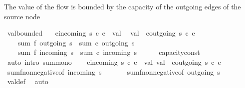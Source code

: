 \begin{isabellebody}
{\isafoldproof}%
%
\isadelimproof
%
\endisadelimproof
%
\begin{isamarkuptext}%
The value of the flow is bounded by the capacity of the 
  outgoing edges of the source node%
\end{isamarkuptext}\isamarkuptrue%
\isamarkupfalse%
\ val{\isacharunderscore}bounded{\isacharcolon}\ \isanewline
\ \ {\isachardoublequoteopen}{\isacharminus}{\isacharparenleft}{\isasymSum}e{\isasymin}incoming\ s{\isachardot}\ c\ e{\isacharparenright}\ {\isasymle}\ val{\isachardoublequoteclose}\isanewline
\ \ {\isachardoublequoteopen}val\ {\isasymle}\ {\isacharparenleft}{\isasymSum}e{\isasymin}outgoing\ s{\isachardot}\ c\ e{\isacharparenright}{\isachardoublequoteclose}\isanewline
%
\isadelimproof
%
\endisadelimproof
%
\isatagproof
{}\isamarkupfalse%
\ {\isacharminus}\isanewline
\ \ \isamarkupfalse%
\ \isanewline
\ \ \ \ {\isachardoublequoteopen}sum\ f\ {\isacharparenleft}outgoing\ s{\isacharparenright}\ {\isasymle}\ sum\ c\ {\isacharparenleft}outgoing\ s{\isacharparenright}{\isachardoublequoteclose}\isanewline
\ \ \ \ {\isachardoublequoteopen}sum\ f\ {\isacharparenleft}incoming\ s{\isacharparenright}\ {\isasymle}\ sum\ c\ {\isacharparenleft}incoming\ s{\isacharparenright}{\isachardoublequoteclose}\isanewline
\ \ \ \ \isamarkupfalse%
\ capacity{\isacharunderscore}const\ \isamarkupfalse%
\ {\isacharparenleft}auto\ intro{\isacharbang}{\isacharcolon}\ sum{\isacharunderscore}mono{\isacharparenright}\isanewline
\ \ \isamarkupfalse%
\ {\isachardoublequoteopen}{\isacharminus}{\isacharparenleft}{\isasymSum}e{\isasymin}incoming\ s{\isachardot}\ c\ e{\isacharparenright}\ {\isasymle}\ val{\isachardoublequoteclose}\ {\isachardoublequoteopen}val\ {\isasymle}\ {\isacharparenleft}{\isasymSum}e{\isasymin}outgoing\ s{\isachardot}\ c\ e{\isacharparenright}{\isachardoublequoteclose}\ \isanewline
\ \ \ \ \isamarkupfalse%
\ sum{\isacharunderscore}f{\isacharunderscore}non{\isacharunderscore}negative{\isacharbrackleft}of\ {\isachardoublequoteopen}incoming\ s{\isachardoublequoteclose}{\isacharbrackright}\ \isanewline
\ \ \ \ \isamarkupfalse%
\ sum{\isacharunderscore}f{\isacharunderscore}non{\isacharunderscore}negative{\isacharbrackleft}of\ {\isachardoublequoteopen}outgoing\ s{\isachardoublequoteclose}{\isacharbrackright}\ \ \isanewline
\ \ \ \ \isamarkupfalse%
\ val{\isacharunderscore}def\ \isamarkupfalse%
\ auto\ \isanewline
{}\isamarkupfalse%
%

\end{isabellebody}

